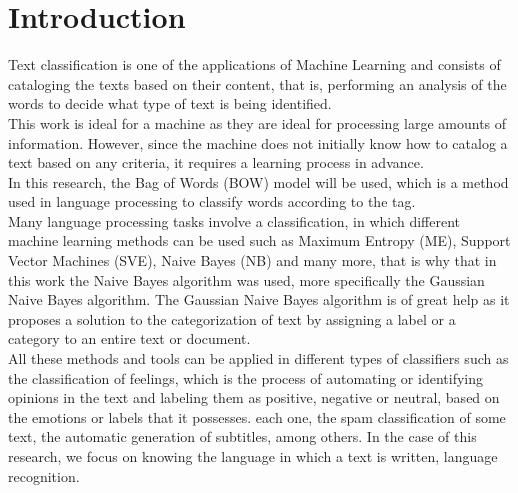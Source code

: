 \documentclass[sigconf,12pt,review=false,natbib=false]{acmart}
\begin{document}
\maketitle

\section{Introduction}

Text classification is one of the applications of Machine Learning and consists of cataloging the
texts based on their content, that is, performing an analysis of the words to decide what type of
text is being identified. \\

This work is ideal for a machine as they are ideal for processing large amounts of information.
However, since the machine does not initially know how to catalog a text based on any criteria, it
requires a learning process in advance. \\

In this research, the Bag of Words (BOW) model will be used, which is a method used in language
processing to classify words according to the tag. \\

Many language processing tasks involve a classification, in which different machine learning methods
can be used such as Maximum Entropy (ME), Support Vector Machines (SVE), Naive Bayes (NB) and many
more, that is why that in this work the Naive Bayes algorithm was used, more specifically the
Gaussian Naive Bayes algorithm. The Gaussian Naive Bayes algorithm is of great help as it proposes a
solution to the categorization of text by assigning a label or a category to an entire text or
document. \\

All these methods and tools can be applied in different types of classifiers such as the
classification of feelings, which is the process of automating or identifying opinions in the text
and labeling them as positive, negative or neutral, based on the emotions or labels that it possesses.
each one, the spam classification of some text, the automatic generation of subtitles, among others.
In the case of this research, we focus on knowing the language in which a text is written, language
recognition. \\
\end{document}
